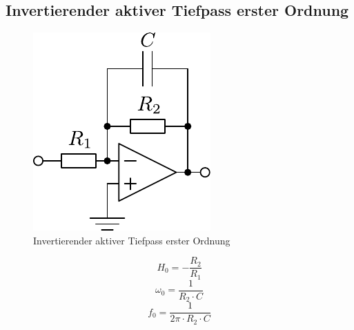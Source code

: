 



\subsection{Invertierender aktiver Tiefpass erster Ordnung}
\begin{figure}[h!]
	\centering
	\includegraphics[scale=\schscale]{op_tp_o1_inv.pdf}
	\caption{Invertierender aktiver Tiefpass erster Ordnung}
	\label{sch:op-tp-o1-inv}
\end{figure}
\[ H_0 = - \frac{R_2}{R_1} \]
\[ \omega_0 = \frac{1}{R_2 \cdot C} \]
\[ f_0 = \frac{1}{2 \pi \cdot R_2 \cdot C} \]
